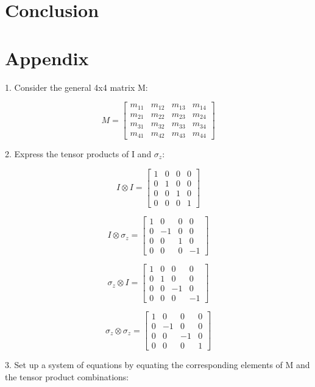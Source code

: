 \documentclass[english,notitlepage,reprint,nofootinbib]{revtex4-1}
\begin{document}
\section{Conclusion}\label{sec:conclusion}

\section*{Appendix}\label{sec:app}

1. Consider the general 4x4 matrix M:

\[
M = \begin{bmatrix}
m_{11} & m_{12} & m_{13} & m_{14} \\
m_{21} & m_{22} & m_{23} & m_{24} \\
m_{31} & m_{32} & m_{33} & m_{34} \\
m_{41} & m_{42} & m_{43} & m_{44}
\end{bmatrix}
\]

2. Express the tensor products of I and $\sigma_z$:

\[
I \otimes I = \begin{bmatrix}
1 & 0 & 0 & 0 \\
0 & 1 & 0 & 0 \\
0 & 0 & 1 & 0 \\
0 & 0 & 0 & 1
\end{bmatrix}
\]

\[
I \otimes \sigma_z = \begin{bmatrix}
1 & 0 & 0 & 0 \\
0 & -1 & 0 & 0 \\
0 & 0 & 1 & 0 \\
0 & 0 & 0 & -1
\end{bmatrix}
\]

\[
\sigma_z \otimes I = \begin{bmatrix}
1 & 0 & 0 & 0 \\
0 & 1 & 0 & 0 \\
0 & 0 & -1 & 0 \\
0 & 0 & 0 & -1
\end{bmatrix}
\]

\[
\sigma_z \otimes \sigma_z = \begin{bmatrix}
1 & 0 & 0 & 0 \\
0 & -1 & 0 & 0 \\
0 & 0 & -1 & 0 \\
0 & 0 & 0 & 1
\end{bmatrix}
\]

3. Set up a system of equations by equating the corresponding elements of M and the tensor product combinations:
\end{document}
